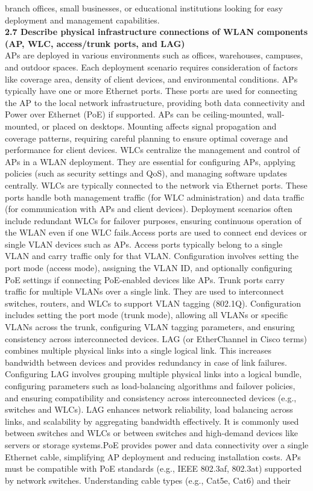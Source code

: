 \documentclass{article}
\begin{document}
branch offices, small businesses, or educational institutions looking for easy deployment and management capabilities.\\
  	
\noindent\textbf{2.7 Describe physical infrastructure connections of WLAN components (AP, WLC, access/trunk ports, and LAG)}\\

	APs are deployed in various environments such as offices, warehouses, campuses, and outdoor spaces. Each deployment scenario requires consideration of factors like coverage area, density of client devices, and environmental conditions. APs typically have one or more Ethernet ports. These ports are used for connecting the AP to the local network infrastructure, providing both data connectivity and Power over Ethernet (PoE) if supported. APs can be ceiling-mounted, wall-mounted, or placed on desktops. Mounting affects signal propagation and coverage patterns, requiring careful planning to ensure optimal coverage and performance for client devices. WLCs centralize the management and control of APs in a WLAN deployment. They are essential for configuring APs, applying policies (such as security settings and QoS), and managing software updates centrally. WLCs are typically connected to the network via Ethernet ports. These ports handle both management traffic (for WLC administration) and data traffic (for communication with APs and client devices). Deployment scenarios often include redundant WLCs for failover purposes, ensuring continuous operation of the WLAN even if one WLC fails.Access ports are used to connect end devices or single VLAN devices such as APs. Access ports typically belong to a single VLAN and carry traffic only for that VLAN. Configuration involves setting the port mode (access mode), assigning the VLAN ID, and optionally configuring PoE settings if connecting PoE-enabled devices like APs. Trunk ports carry traffic for multiple VLANs over a single link. They are used to interconnect switches, routers, and WLCs to support VLAN tagging (802.1Q). Configuration includes setting the port mode (trunk mode), allowing all VLANs or specific VLANs across the trunk, configuring VLAN tagging parameters, and ensuring consistency across interconnected devices. LAG (or EtherChannel in Cisco terms) combines multiple physical links into a single logical link. This increases bandwidth between devices and provides redundancy in case of link failures. Configuring LAG involves grouping multiple physical links into a logical bundle, configuring parameters such as load-balancing algorithms and failover policies, and ensuring compatibility and consistency across interconnected devices (e.g., switches and WLCs).  LAG enhances network reliability, load balancing across links, and scalability by aggregating bandwidth effectively. It is commonly used between switches and WLCs or between switches and high-demand devices like servers or storage systems.PoE provides power and data connectivity over a single Ethernet cable, simplifying AP deployment and reducing installation costs. APs must be compatible with PoE standards (e.g., IEEE 802.3af, 802.3at) supported by network switches. Understanding cable types (e.g., Cat5e, Cat6) and their 
\end{document}
